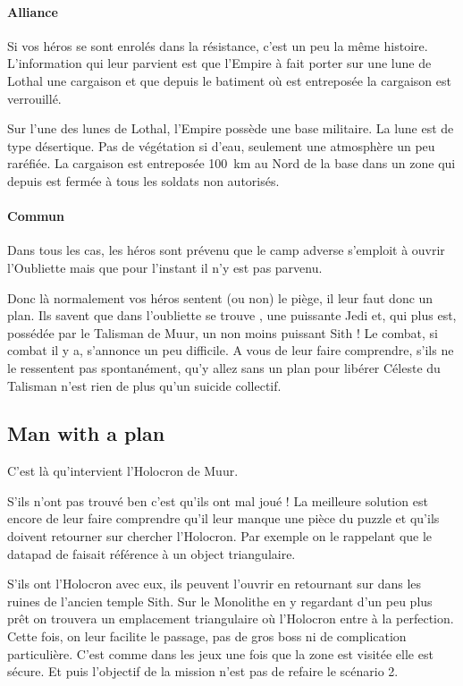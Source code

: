 \paragraph{Alliance}
Si vos héros se sont enrolés dans la résistance, c’est un peu la même histoire. L’information qui leur parvient est que l’Empire à fait porter sur une lune de Lothal une cargaison et que depuis le batiment où est entreposée la cargaison est verrouillé. 

Sur l’une des lunes de Lothal, l’Empire possède une base militaire. La lune est de type désertique. Pas de végétation si d’eau, seulement une atmosphère un peu raréfiée. La cargaison est entreposée 100~km au Nord de la base dans un zone qui depuis est fermée à tous les soldats non autorisés.

\paragraph{Commun}
Dans tous les cas, les héros sont prévenu que le camp adverse s’emploit à ouvrir l’Oubliette mais que pour l’instant il n’y est pas parvenu.

Donc là normalement vos héros sentent (ou non) le piège, il leur faut donc un plan. Ils savent que dans l’oubliette se trouve , une puissante Jedi et, qui plus est, possédée par le Talisman de Muur, un non moins puissant Sith ! Le combat, si combat il y a, s’annonce un peu difficile. A vous de leur faire comprendre, s’ils ne le ressentent pas spontanément, qu’y allez sans un plan pour libérer Céleste du Talisman n’est rien de plus qu’un suicide collectif.

\subsection{Man with a plan}
C’est là qu’intervient l’Holocron de Muur.

S’ils n’ont pas trouvé ben c’est qu’ils ont mal joué ! La meilleure solution est encore de leur faire comprendre qu’il leur manque une pièce du puzzle et qu’ils doivent retourner sur  chercher l’Holocron. Par exemple on le rappelant que le datapad de  faisait référence à un object triangulaire.

S’ils ont l’Holocron avec eux, ils peuvent l’ouvrir en retournant sur  dans les ruines de l’ancien temple Sith. Sur le Monolithe en y regardant d’un peu plus prêt on trouvera un emplacement triangulaire où l’Holocron entre à la perfection. Cette fois, on leur facilite le passage, pas de gros boss ni de complication particulière. C’est comme dans les jeux une fois que la zone est visitée elle est sécure. Et puis l’objectif de la mission n’est pas de refaire le scénario 2.



